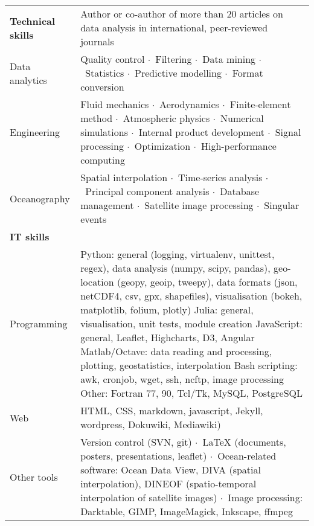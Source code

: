 \documentclass[10pt,a4paper,svgnames]{article}
\newcommand{\sepa}{$\cdot$~}
\begin{document}
\begin{tabular}{p{}| p{}}

\textbf{Technical skills} & Author or co-author of more than 20 articles on data analysis in international, peer-reviewed journals\\
Data analytics & Quality control \sepa Filtering \sepa Data mining \sepa Statistics \sepa Predictive modelling \sepa Format conversion\\

Engineering & Fluid mechanics \sepa Aerodynamics \sepa Finite-element method \sepa Atmospheric physics \sepa Numerical simulations \sepa Internal product development \sepa Signal processing \sepa Optimization \sepa High-performance computing \\

Oceanography & Spatial interpolation \sepa Time-series analysis \sepa Principal component analysis \sepa Database management \sepa Satellite image processing \sepa Singular events \\

\textbf{IT skills} & \\

Programming & Python: general (logging, virtualenv, unittest, regex), data analysis (numpy, scipy, pandas), geo-location (geopy, geoip, tweepy), data formats (json, netCDF4, csv, gpx, shapefiles), visualisation (bokeh, matplotlib, folium, plotly) 
\newline Julia: general, visualisation, unit tests, module creation
\newline JavaScript: general, Leaflet, Highcharts, D3, Angular
\newline Matlab/Octave: data reading and processing, plotting, geostatistics, interpolation
\newline Bash scripting: awk, cronjob, wget, ssh, ncftp, image processing
\newline Other: Fortran 77, 90, Tcl/Tk, MySQL, PostgreSQL\\
Web & HTML, CSS, markdown, javascript, Jekyll, wordpress, Dokuwiki, Mediawiki)\\	
Other tools & Version control (SVN, git) \sepa LaTeX (documents, posters, presentations, leaflet) \sepa  Ocean-related software: Ocean Data View, DIVA (spatial interpolation), DINEOF (spatio-temporal interpolation of satellite images) \sepa Image processing: Darktable, GIMP, ImageMagick, Inkscape, ffmpeg\\


\end{tabular}
\end{document}
